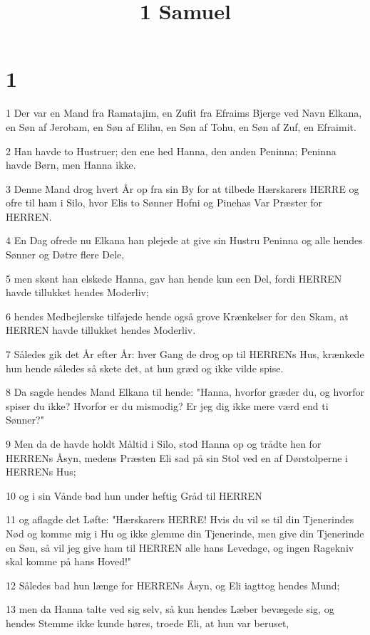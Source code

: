 

\title{1 Samuel}


\chapter{1}

\par 1 Der var en Mand fra Ramatajim, en Zufit fra Efraims Bjerge ved Navn Elkana, en Søn af Jerobam, en Søn af Elihu, en Søn af Tohu, en Søn af Zuf, en Efraimit.
\par 2 Han havde to Hustruer; den ene hed Hanna, den anden Peninna; Peninna havde Børn, men Hanna ikke.
\par 3 Denne Mand drog hvert År op fra sin By for at tilbede Hærskarers HERRE og ofre til ham i Silo, hvor Elis to Sønner Hofni og Pinehas Var Præster for HERREN.
\par 4 En Dag ofrede nu Elkana han plejede at give sin Hustru Peninna og alle hendes Sønner og Døtre flere Dele,
\par 5 men skønt han elskede Hanna, gav han hende kun een Del, fordi HERREN havde tillukket hendes Moderliv;
\par 6 hendes Medbejlerske tilføjede hende også grove Krænkelser for den Skam, at HERREN havde tillukket hendes Moderliv.
\par 7 Således gik det År efter År: hver Gang de drog op til HERRENs Hus, krænkede hun hende således så skete det, at hun græd og ikke vilde spise.
\par 8 Da sagde hendes Mand Elkana til hende: "Hanna, hvorfor græder du, og hvorfor spiser du ikke? Hvorfor er du mismodig? Er jeg dig ikke mere værd end ti Sønner?"
\par 9 Men da de havde holdt Måltid i Silo, stod Hanna op og trådte hen for HERRENs Åsyn, medens Præsten Eli sad på sin Stol ved en af Dørstolperne i HERRENs Hus;
\par 10 og i sin Vånde bad hun under heftig Gråd til HERREN
\par 11 og aflagde det Løfte: "Hærskarers HERRE! Hvis du vil se til din Tjenerindes Nød og komme mig i Hu og ikke glemme din Tjenerinde, men give din Tjenerinde en Søn, så vil jeg give ham til HERREN alle hans Levedage, og ingen Ragekniv skal komme på hans Hoved!"
\par 12 Således bad hun længe for HERRENs Åsyn, og Eli iagttog hendes Mund;
\par 13 men da Hanna talte ved sig selv, så kun hendes Læber bevægede sig, og hendes Stemme ikke kunde høres, troede Eli, at hun var beruset,
